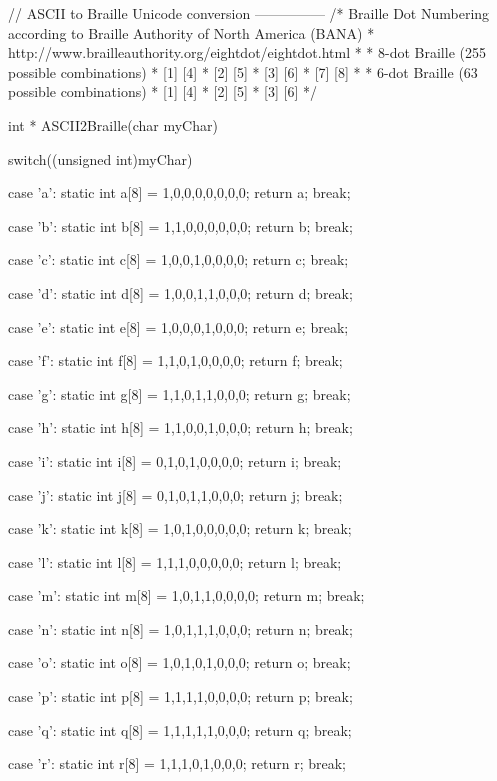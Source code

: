 // ASCII to Braille Unicode conversion ---------------
/* Braille Dot Numbering according to Braille Authority of North America (BANA) 
 * http://www.brailleauthority.org/eightdot/eightdot.html
 * 
 * 8-dot Braille (255 possible combinations)
 * [1] [4]
 * [2] [5]
 * [3] [6]
 * [7] [8]
 * 
 * 6-dot Braille (63 possible combinations)
 * [1] [4]
 * [2] [5]
 * [3] [6]
 */

int * ASCII2Braille(char myChar){
  switch((unsigned int)myChar)
  {
    case 'a':
    static int a[8] = {1,0,0,0,0,0,0,0};
    return a;
    break;

    case 'b':
    static int b[8] = {1,1,0,0,0,0,0,0};
    return b;
    break;

    case 'c':
    static int c[8] = {1,0,0,1,0,0,0,0};
    return c;
    break;
    
    case 'd':
    static int d[8] = {1,0,0,1,1,0,0,0};
    return d;
    break;

    case 'e':
    static int e[8] = {1,0,0,0,1,0,0,0};
    return e;
    break;

    case 'f':
    static int f[8] = {1,1,0,1,0,0,0,0};
    return f;
    break;

    case 'g':
    static int g[8] = {1,1,0,1,1,0,0,0};
    return g;
    break;
 
    case 'h':
    static int h[8] = {1,1,0,0,1,0,0,0};
    return h;
    break;

    case 'i':
    static int i[8] = {0,1,0,1,0,0,0,0};
    return i;
    break;

    case 'j':
    static int j[8] = {0,1,0,1,1,0,0,0};
    return j;
    break;

    case 'k':
    static int k[8] = {1,0,1,0,0,0,0,0};
    return k;
    break;

    case 'l':
    static int l[8] = {1,1,1,0,0,0,0,0};
    return l;
    break;

    case 'm':
    static int m[8] = {1,0,1,1,0,0,0,0};
    return m;
    break;

    case 'n':
    static int n[8] = {1,0,1,1,1,0,0,0};
    return n;
    break;
    
    case 'o':
    static int o[8] = {1,0,1,0,1,0,0,0};
    return o;
    break;

    case 'p':
    static int p[8] = {1,1,1,1,0,0,0,0};
    return p;
    break;

    case 'q':
    static int q[8] = {1,1,1,1,1,0,0,0};
    return q;
    break;

    case 'r':
    static int r[8] = {1,1,1,0,1,0,0,0};
    return r;
    break;

}}
